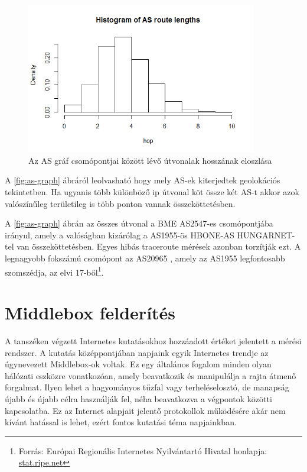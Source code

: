 \begin{figure}[h]
	\centering
	\includegraphics[width=0.9\textwidth, keepaspectratio]{figures/as-hop-hist.png}
	\caption{Az AS gráf csomópontjai között lévő útvonalak hosszának eloszlása}
	\label{fig:ip-map}
\end{figure}

A \ref{fig:as-graph} ábráról leolvasható hogy mely AS-ek kiterjedtek geolokációs tekintetben. Ha ugyanis több különböző ip útvonal köt össze két AS-t akkor azok valószínűleg területileg is több ponton vannak összeköttetésben.

A \ref{fig:as-graph} ábrán az összes útvonal a BME AS2547-es csomópontjába irányul, amely a valóságban kizárólag a AS1955-ös HBONE-AS HUNGARNET-tel van összeköttetésben. Egyes hibás traceroute mérések azonban torzítják ezt. A legnagyobb fokszámú csomópont az AS20965 , amely az AS1955 legfontosabb szomszédja, az elvi 17-ből\footnote{Forrás: Európai Regionális Internetes Nyilvántartó Hivatal honlapja: \href{https://stat.ripe.net/widget/asn-neighbours\#w.resource=1955}{stat.ripe.net}}.


\section{Middlebox felderítés}
A tanszéken végzett Internetes kutatásokhoz hozzáadott értéket jelentett a mérési rendszer. A kutatás középpontjában napjaink egyik Internetes trendje az úgynevezett Middlebox-ok voltak. Ez egy általános fogalom minden olyan hálózati eszközre vonatkozóan, amely beavatkozik és manipulálja a rajta átmenő forgalmat. Ilyen lehet a hagyományos tűzfal vagy terheléselosztó, de manapság újabb és újabb célra használják fel, néha beavatkozva a végpontok közötti kapcsolatba. Ez az Internet alapjait jelentő protokollok működésére akár nem kívánt hatással is lehet, ezért fontos kutatási téma napjainkban.


